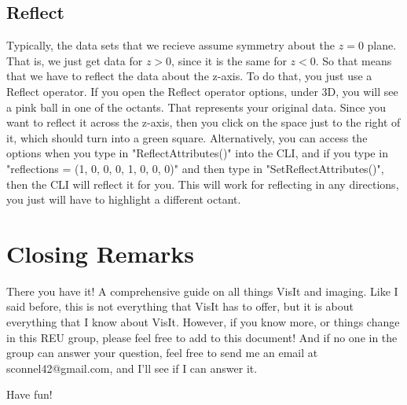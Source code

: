 \documentclass[english]{article}
\begin{document}
    \subsection{Reflect}
    Typically, the data sets that we recieve assume symmetry about the $z = 0$ plane. That is, we just get data for $z > 0$,
    since it is the same for $z < 0$. So that means that we have to reflect the data about the z-axis. To do that, you just
    use a Reflect operator. If you open the Reflect operator options, under 3D, you will see a pink ball in one of the octants.
    That represents your original data. Since you want to reflect it across the z-axis, then you click on the space just to
    the right of it, which should turn into a green square. Alternatively, you can access the options when you type in
    "ReflectAttributes()" into the CLI, and if you type in "reflections = (1, 0, 0, 0, 1, 0, 0, 0)" and then type in 
    "SetReflectAttributes()", then the CLI will reflect it for you. This will work for reflecting in any directions, you just
    will have to highlight a different octant.  


\section{Closing Remarks}
There you have it! A comprehensive guide on all things VisIt and imaging. Like I said before, this is not
everything that VisIt has to offer, but it is about everything that I know about VisIt. However, if you know
more, or things change in this REU group, please feel free to add to this document! And if no one in the group 
can answer your question, feel free to send me an email at sconnel42@gmail.com, and I'll see if I can answer it.

Have fun!
\end{document}
